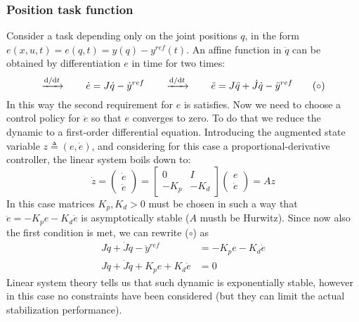 	\subsubsection{Position task function} 
	Consider a task depending only on the joint positions $q$, in the form $e(x,u,t) = e(q,t) = y(q) - y^{ref}(t)$.
	An affine function in $\ddot q$ can be obtained by differentiation $e$ in time for two times:
	\[ \xrightarrow{\mathrm{d}/\mathrm{d} t} \qquad \dot e = J\dot q - \dot y^{ref} \qquad \xrightarrow{\mathrm{d}/\mathrm{d} t} \qquad \ddot e = J \ddot q + \dot J \dot q - \ddot y^{ref} \tag{$\circ$}  \]
	In this way the second requirement for $e$ is satisfies. 
	Now we need to choose a control policy for $\ddot{e}$ so that $e$ converges to zero.
	To do that we reduce the dynamic to a first-order differential equation. 
	Introducing the augmented state variable $z \triangleq (e,\dot e)$, and considering for this case a proportional-derivative controller, the linear system boils down to:
	\[ \dot z = \begin{pmatrix}
		\dot e \\ \ddot e
	\end{pmatrix} = \begin{bmatrix}
		0 & I \\ -K_p & - K_d
	\end{bmatrix} \begin{pmatrix}
		e \\ \dot e
	\end{pmatrix} = A z  \]
	In this case matrices $K_p,K_d > 0$ must be chosen in such a way that $\ddot e = -K_p e - K_d \dot e$ is asymptotically stable ($A$ musth be Hurwitz). 
	Since now also the first condition is met, we can rewrite ($\circ$) as
	\begin{align*}
		J\ddot q + \dot J \dot q - \ddot y^{ref} & = - K_p e - K_d \dot e \\
		J\ddot q + \dot J \dot q + K_p e + K_d \dot e & = 0
	\end{align*}
	Linear system theory tells us that such dynamic is exponentially stable, however in this case no constraints have been considered (but they can limit the actual stabilization performance).


